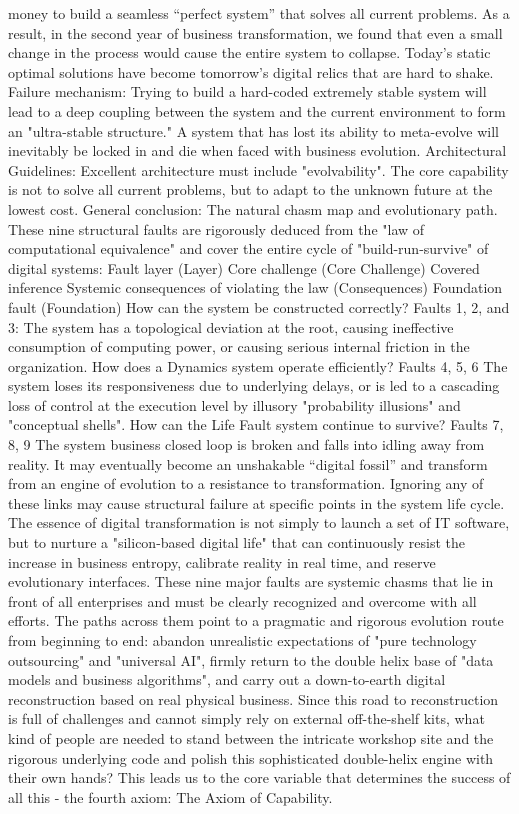 \documentclass[11pt,a4paper]{article}
\begin{document}
money to build a seamless “perfect system” that solves all current problems. As a result, in the second year of business transformation, we found that even a small change in the process would cause the entire system to collapse. Today’s static optimal solutions have become tomorrow’s digital relics that are hard to shake. Failure mechanism: Trying to build a hard-coded extremely stable system will lead to a deep coupling between the system and the current environment to form an "ultra-stable structure." A system that has lost its ability to meta-evolve will inevitably be locked in and die when faced with business evolution. Architectural Guidelines: Excellent architecture must include "evolvability". The core capability is not to solve all current problems, but to adapt to the unknown future at the lowest cost. General conclusion: The natural chasm map and evolutionary path. These nine structural faults are rigorously deduced from the "law of computational equivalence" and cover the entire cycle of "build-run-survive" of digital systems: Fault layer (Layer) Core challenge (Core Challenge) Covered inference Systemic consequences of violating the law (Consequences) Foundation fault (Foundation) How can the system be constructed correctly? Faults 1, 2, and 3: The system has a topological deviation at the root, causing ineffective consumption of computing power, or causing serious internal friction in the organization. How does a Dynamics system operate efficiently? Faults 4, 5, 6 The system loses its responsiveness due to underlying delays, or is led to a cascading loss of control at the execution level by illusory "probability illusions" and "conceptual shells". How can the Life Fault system continue to survive? Faults 7, 8, 9 The system business closed loop is broken and falls into idling away from reality. It may eventually become an unshakable “digital fossil” and transform from an engine of evolution to a resistance to transformation. Ignoring any of these links may cause structural failure at specific points in the system life cycle. The essence of digital transformation is not simply to launch a set of IT software, but to nurture a "silicon-based digital life" that can continuously resist the increase in business entropy, calibrate reality in real time, and reserve evolutionary interfaces. These nine major faults are systemic chasms that lie in front of all enterprises and must be clearly recognized and overcome with all efforts. The paths across them point to a pragmatic and rigorous evolution route from beginning to end: abandon unrealistic expectations of "pure technology outsourcing" and "universal AI", firmly return to the double helix base of "data models and business algorithms", and carry out a down-to-earth digital reconstruction based on real physical business. Since this road to reconstruction is full of challenges and cannot simply rely on external off-the-shelf kits, what kind of people are needed to stand between the intricate workshop site and the rigorous underlying code and polish this sophisticated double-helix engine with their own hands? This leads us to the core variable that determines the success of all this - the fourth axiom: The Axiom of Capability.
\end{document}
